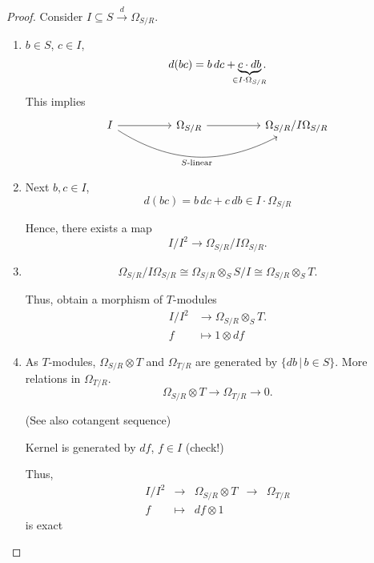 \documentclass[12pt]{article}
\theoremstyle{definition}
\theoremstyle{remark}
\begin{document}
\begin{proof}
Consider $I\subseteq S\xrightarrow{d}\Omega_{S/R}$.

\begin{enumerate}[label=\alph*)]
\item $b\in S$, $c\in I$,
\[d(bc)=b\,dc+\underbrace{c\cdot db}_{\mathclap{\in I\cdot\Omega_{S/R}}}.\]
This implies
\[
\begin{tikzcd}
I\arrow[rr]\arrow[rrrr,bend right,"S\text{-linear}",swap]&&\Omega_{S/R}\arrow[rr]&&\Omega_{S/R}/I\Omega_{S/R}
\end{tikzcd}
\]

\item Next $b,c\in I$,
\[d(bc)=b\,dc+c\,db\in I\cdot\Omega_{S/R}\]

Hence, there exists a map
\[I/I^2\longrightarrow\Omega_{S/R}/I\Omega_{S/R}.\]

\item
\[\Omega_{S/R}/I\Omega_{S/R}\cong\Omega_{S/R}\otimes_SS/I\cong\Omega_{S/R}\otimes_ST.\]

Thus, obtain a morphism of $T$-modules
\begin{align*}
I/I^2&\longrightarrow\Omega_{S/R}\otimes_ST.\\
f&\longmapsto1\otimes df
\end{align*}

\item As $T$-modules, $\Omega_{S/R}\otimes T$ and $\Omega_{T/R}$ are generated by $\{db\,|\,b\in S\}$. More relations in $\Omega_{T/R}$.
\[\Omega_{S/R}\otimes T\longrightarrow\Omega_{T/R}\longrightarrow0.\]

(See also cotangent sequence)

Kernel is generated by $df$, $f\in I$ (check!)

Thus,
\[
\begin{array}{rclcc}
I/I^2&\longrightarrow&\Omega_{S/R}\otimes T&\longrightarrow&\Omega_{T/R}\\
f&\longmapsto&df\otimes1
\end{array}
\]
is exact
\end{enumerate}
\end{proof}
\end{document}
